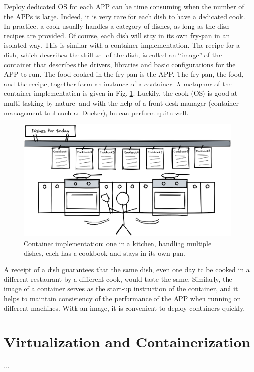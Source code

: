 Deploy dedicated OS for each APP can be time consuming when the number of the APPs is large. Indeed, it is very rare for each dish to have a dedicated cook. In practice, a cook usually handles a category of dishes, as long as the dish recipes are provided. Of course, each dish will stay in its own fry-pan in an isolated way. This is similar with a container implementation. The recipe for a dish, which describes the skill set of the dish, is called an ``image'' of the container that describes the drivers, libraries and basic configurations for the APP to run. The food cooked in the fry-pan is the APP. The fry-pan, the food, and the recipe, together form an instance of a container. A metaphor of the container implementation is given in Fig. \ref{ch:vac:fig:multitaskcook}. Luckily, the cook (OS) is good at multi-tasking by nature, and with the help of a front desk manager (container management tool such as Docker), he can perform quite well.
\begin{figure}
	\centering
	\includegraphics[width=350pt]{chapters/ch-virtualization-and-containerization/figures/multitaskcook.png}
	\caption{Container implementation: one in a kitchen, handling multiple dishes, each has a cookbook and stays in its own pan.} \label{ch:vac:fig:multitaskcook}
\end{figure}

A receipt of a dish guarantees that the same dish, even one day to be cooked in a different restaurant by a different cook, would taste the same. Similarly, the image of a container serves as the start-up instruction of the container, and it helps to maintain consistency of the performance of the APP when running on different machines. With an image, it is convenient to deploy containers quickly.

\section{Virtualization and Containerization}
...

